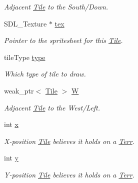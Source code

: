 \begin{DoxyCompactItemize}
\begin{DoxyCompactList}\small\item\em Adjacent \hyperlink{class_tile}{Tile} to the South/\+Down. \end{DoxyCompactList}\item 
S\+D\+L\+\_\+\+Texture $\ast$ \hyperlink{class_tile_ab1697dda1927feabb756c0798771c116}{tex}\hypertarget{class_tile_ab1697dda1927feabb756c0798771c116}{}\label{class_tile_ab1697dda1927feabb756c0798771c116}

\begin{DoxyCompactList}\small\item\em Pointer to the spritesheet for this \hyperlink{class_tile}{Tile}. \end{DoxyCompactList}\item 
tile\+Type \hyperlink{class_tile_a5aa7ae6350675967edf46400c486a412}{type}\hypertarget{class_tile_a5aa7ae6350675967edf46400c486a412}{}\label{class_tile_a5aa7ae6350675967edf46400c486a412}

\begin{DoxyCompactList}\small\item\em Which type of tile to draw. \end{DoxyCompactList}\item 
weak\+\_\+ptr$<$ \hyperlink{class_tile}{Tile} $>$ \hyperlink{class_tile_ae204f0d7ecc0da698dba11c9c33c3deb}{W}\hypertarget{class_tile_ae204f0d7ecc0da698dba11c9c33c3deb}{}\label{class_tile_ae204f0d7ecc0da698dba11c9c33c3deb}

\begin{DoxyCompactList}\small\item\em Adjacent \hyperlink{class_tile}{Tile} to the West/\+Left. \end{DoxyCompactList}\item 
int \hyperlink{class_tile_a47b5eb2072d4b1978923a480043899c9}{x}\hypertarget{class_tile_a47b5eb2072d4b1978923a480043899c9}{}\label{class_tile_a47b5eb2072d4b1978923a480043899c9}

\begin{DoxyCompactList}\small\item\em X-\/position \hyperlink{class_tile}{Tile} believes it holds on a \hyperlink{class_terr}{Terr}. \end{DoxyCompactList}\item 
int \hyperlink{class_tile_a2d87d8813151af6bbd60811964f047a8}{y}\hypertarget{class_tile_a2d87d8813151af6bbd60811964f047a8}{}\label{class_tile_a2d87d8813151af6bbd60811964f047a8}

\begin{DoxyCompactList}\small\item\em Y-\/position \hyperlink{class_tile}{Tile} believes it holds on a \hyperlink{class_terr}{Terr}. \end{DoxyCompactList}\end{DoxyCompactItemize}



